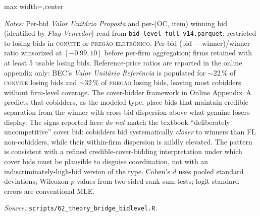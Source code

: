 \begin{table}[htbp]
\begin{adjustbox}{max width=\textwidth,center}
\begin{threeparttable}
\begin{tablenotes}
\item \textit{Notes:} Per-bid \textit{Valor Unit\'ario Proposta} and per-(OC, item) winning bid (identified by \textit{Flag Vencedor}) read from \texttt{bid\_level\_full\_v14.parquet}; restricted to losing bids in \textsc{convite} or \textsc{preg\~ao eletr\^onico}. Per-bid (bid $-$ winner)/winner ratio winsorized at $[-0.99, 10]$ before per-firm aggregation; firms retained with at least 5 usable losing bids. Reference-price ratios are reported in the online appendix only: BEC's \textit{Valor Unit\'ario Refer\^encia} is populated for $\sim$22\,\% of \textsc{convite} losing bids and $\sim$32\,\% of \textsc{preg\~ao} losing bids, leaving most cobidders without firm-level coverage. The cover-bidder framework in Online Appendix~A predicts that cobidders, as the modeled type, place bids that maintain credible separation from the winner with cross-bid dispersion above what genuine losers display. The signs reported here \emph{do not} match the textbook ``deliberately uncompetitive'' cover bid: cobidders bid systematically \emph{closer} to winners than FL non-cobidders, while their within-firm dispersion is mildly elevated. The pattern is consistent with a refined credible-cover-bidding interpretation under which cover bids must be plausible to disguise coordination, not with an indiscriminately-high-bid version of the type. Cohen's $d$ uses pooled standard deviations; Wilcoxon $p$-values from two-sided rank-sum tests; logit standard errors are conventional MLE.
\item \textit{Source:} \texttt{scripts/62\_theory\_bridge\_bidlevel.R}.
\end{tablenotes}
\end{threeparttable}
\end{adjustbox}
\end{table}
